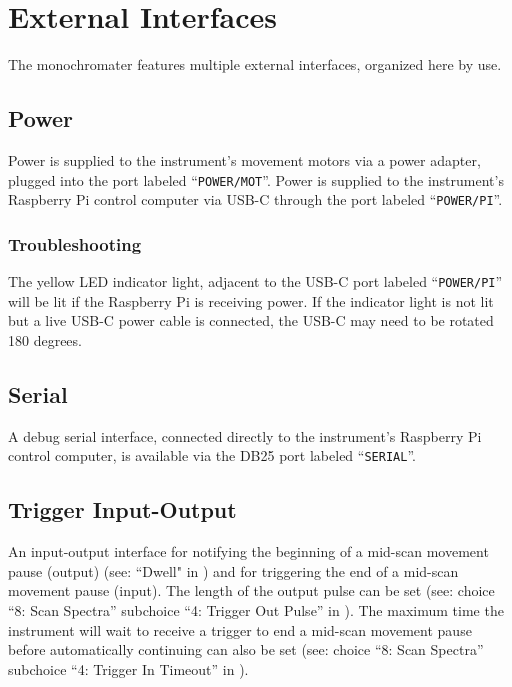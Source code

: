 \documentclass{article}
\begin{document}
\section{External Interfaces} \label{section:externalinterfaces}

The monochromater features multiple external interfaces, organized here by use.

\subsection{Power}

Power is supplied to the instrument's movement motors via a power adapter, plugged into the port labeled ``\verb|POWER/MOT|''. Power is supplied to the instrument's Raspberry Pi control computer via USB-C through the port labeled ``\verb|POWER/PI|''. 

\subsubsection{Troubleshooting}

The yellow LED indicator light, adjacent to the USB-C port labeled ``\verb|POWER/PI|'' will be lit if the Raspberry Pi is receiving power. If the indicator light is not lit but a live USB-C power cable is connected, the USB-C may need to be rotated 180 degrees.

\subsection{Serial}

A debug serial interface, connected directly to the instrument's Raspberry Pi control computer, is available via the DB25 port labeled ``\verb|SERIAL|''.

\subsection{Trigger Input-Output} \label{subsection:triggerio}

An input-output interface for notifying the beginning of a mid-scan movement pause (output) (see: ``Dwell" in ) and for triggering the end of a mid-scan movement pause (input). The length of the output pulse can be set (see: choice ``8: Scan Spectra'' subchoice ``4: Trigger Out Pulse'' in ). The maximum time the instrument will wait to receive a trigger to end a mid-scan movement pause before automatically continuing can also be set (see: choice ``8: Scan Spectra'' subchoice ``4: Trigger In Timeout'' in ).
\end{document}
